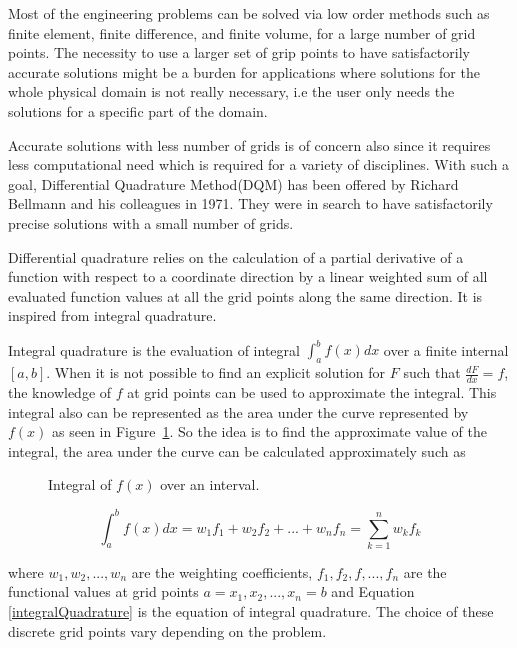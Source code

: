 Most of the engineering problems can be solved via low order methods such as finite element, finite difference, and finite volume, for a large number of grid points. The necessity to use a larger set of grip points to have satisfactorily accurate solutions might be a burden for applications where solutions for the whole physical domain is not really necessary, i.e the user only needs the solutions for a specific part of the domain.

Accurate solutions with less number of grids is of concern also since it requires less computational need which is required for a variety of disciplines. With such a goal, Differential Quadrature Method(DQM) has been offered by Richard Bellmann and his colleagues in 1971. They were in search to have satisfactorily precise solutions with a small number of grids. 

Differential quadrature relies on the calculation of a partial derivative of a function with respect to a coordinate direction by a linear weighted sum of all evaluated function values at all the grid points along the same direction. It is inspired from integral quadrature.

Integral quadrature is the evaluation of integral $\int_{a}^{b} f(x)dx$ over a finite internal $[a,b]$. When it is not possible to find an explicit solution for $F$ such that $\frac{dF}{dx}=f$, the knowledge of $f$ at grid points can be used to approximate the integral. This integral also can be represented as the area under the curve represented by $f(x)$ as seen in Figure~\ref{intQuad}. So the idea is to find the approximate value of the integral, the area under the curve can be calculated approximately such as

\begin{figure}
\centerline{}
\vspace*{6mm}
\caption{Integral of $f(x)$ over an interval.}
\label{intQuad} 
\end{figure}

\begin{equation} \label{integralQuadrature}
\int_{a}^b f(x)dx = w_1 f_1 + w_2 f_2 + ... + w_n f_n = \sum_{k=1}^n w_k f_k
\end{equation}

where $w_1, w_2, ..., w_n$ are the weighting coefficients, $f_1, f_2, f, ..., f_n$ are the functional values at grid points $a =x_1, x_2, ..., x_n = b$ and Equation \eqref{integralQuadrature} is the equation of integral quadrature. The choice of these discrete grid points vary depending on the problem.

